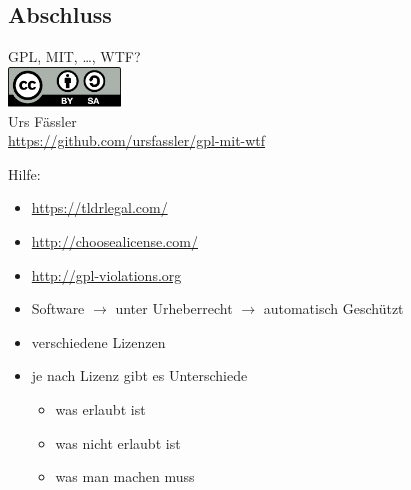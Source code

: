 
\subsection{Abschluss}
\label{sec:zusammenfassung}
\subsectionframe

\begin{frame}
	\begin{center}
		GPL, MIT, \ldots, WTF?\\
		\vspace{1em}
		\pause
		\includegraphics[width=3cm]{res/cc-by-sa.pdf}\\
		\vspace{0.5em}
		Urs Fässler\\
		\pause
		\vspace{0.5em}
		\url{https://github.com/ursfassler/gpl-mit-wtf}\\
	\end{center}

	\pause
	Hilfe:
	\begin{itemize}
		\pause
		\item \url{https://tldrlegal.com/}
		\pause
		\item \url{http://choosealicense.com/}
		\pause
		\item \url{http://gpl-violations.org}
	\end{itemize}
\end{frame}
\note
{
	\begin{itemize}
		\item Software $\rightarrow$ unter Urheberrecht $\rightarrow$ automatisch Geschützt
		\item verschiedene Lizenzen
		\item je nach Lizenz gibt es Unterschiede
		\begin{itemize}
			\item was erlaubt ist
			\item was nicht erlaubt ist
			\item was man machen muss
		\end{itemize}
	\end{itemize}
}

